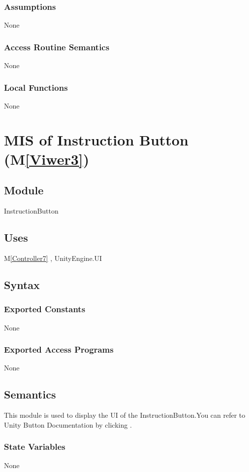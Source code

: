 \documentclass[12pt, titlepage]{article}
\newcommand{\mref}[1]{M\ref{#1}}
\begin{document}
\subsubsection{Assumptions}
None
\subsubsection{Access Routine Semantics}
None
\subsubsection{Local Functions}
None


\newpage

\section{MIS of Instruction Button (\mref{Viwer3})}

\subsection{Module}
InstructionButton

\subsection{Uses}
\mref{Controller7}  , UnityEngine.UI

\subsection{Syntax}
\subsubsection{Exported Constants}
None
\subsubsection{Exported Access Programs}
None

\subsection{Semantics}
This module is used to display the UI of the InstructionButton.You can refer to Unity Button Documentation by clicking \bref.
\subsubsection{State Variables}
None
\end{document}

